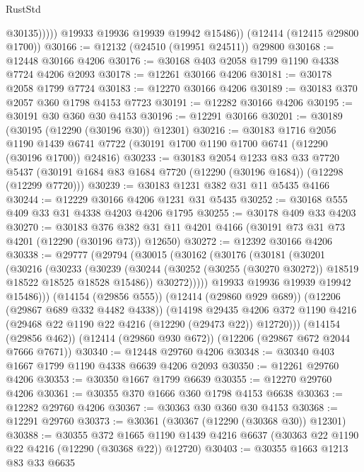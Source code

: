 \begin{lexlean}{RustStd}
\begin{coremodule}
                  @30135)))))
        @19933
        @19936
        @19939
        @19942
        @15486))
    (@12414 (@12415 @29800 @1700))
@30166 := @12132 (@24510 (@19951 @24511)) @29800
@30168 := @12448 @30166 @4206
@30176 := @30168 @403 @2058 @1799 @1190 @4338 @7724 @4206 @2093
@30178 := @12261 @30166 @4206
@30181 := @30178 @2058 @1799 @7724
@30183 := @12270 @30166 @4206
@30189 := @30183 @370 @2057 @360 @1798 @4153 @7723
@30191 := @12282 @30166 @4206
@30195 := @30191 @30 @360 @30 @4153
@30196 := @12291 @30166
@30201 := @30189 (@30195 (@12290 (@30196 @30)) @12301)
@30216 := @30183
    @1716
    @2056
    @1190
    @1439
    @6741
    @7722
    (@30191 @1700 @1190 @1700 @6741 (@12290 (@30196 @1700)) @24816)
@30233 := @30183
    @2054
    @1233
    @83
    @33
    @7720
    @5437
    (@30191 @1684 @83 @1684 @7720 (@12290 (@30196 @1684)) (@12298 (@12299 @7720)))
@30239 := @30183 @1231 @382 @31 @11 @5435 @4166
@30244 := @12229 @30166 @4206 @1231 @31 @5435
@30252 := @30168 @555 @409 @33 @31 @4338 @4203 @4206 @1795
@30255 := @30178 @409 @33 @4203
@30270 := @30183
    @376
    @382
    @31
    @11
    @4201
    @4166
    (@30191 @73 @31 @73 @4201 (@12290 (@30196 @73)) @12650)
@30272 := @12392 @30166 @4206
@30338 := @29777
    (@29794
      (@30015
        (@30162
          (@30176
            (@30181
              (@30201
                (@30216
                  (@30233
                    (@30239
                      (@30244 (@30252 (@30255 (@30270 @30272)) @18519 @18522 @18525 @18528 @15486))
                      @30272)))))
            @19933
            @19936
            @19939
            @19942
            @15486)))
      (@14154 (@29856 @555))
      (@12414 (@29860 @929 @689))
      (@12206 (@29867 @689 @332 @4482 @4338))
      (@14198
        @29435
        @4206
        @372
        @1190
        @4216
        (@29468 @22 @1190 @22 @4216 (@12290 (@29473 @22)) @12720)))
    (@14154 (@29856 @462))
    (@12414 (@29860 @930 @672))
    (@12206 (@29867 @672 @2044 @7666 @7671))
@30340 := @12448 @29760 @4206
@30348 := @30340 @403 @1667 @1799 @1190 @4338 @6639 @4206 @2093
@30350 := @12261 @29760 @4206
@30353 := @30350 @1667 @1799 @6639
@30355 := @12270 @29760 @4206
@30361 := @30355 @370 @1666 @360 @1798 @4153 @6638
@30363 := @12282 @29760 @4206
@30367 := @30363 @30 @360 @30 @4153
@30368 := @12291 @29760
@30373 := @30361 (@30367 (@12290 (@30368 @30)) @12301)
@30388 := @30355
    @372
    @1665
    @1190
    @1439
    @4216
    @6637
    (@30363 @22 @1190 @22 @4216 (@12290 (@30368 @22)) @12720)
@30403 := @30355
    @1663
    @1213
    @83
    @33
    @6635

\end{coremodule}
\end{lexlean}
